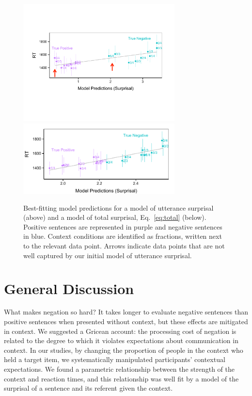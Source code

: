 \documentclass[10pt,letterpaper]{article}
\begin{document}
\begin{figure}[t]
\begin{center} 
\includegraphics[width=3.25in]{figures/model1_comparison.pdf}
\includegraphics[width=3.25in]{figures/model2_comparison.pdf}
\caption{\label{fig:model1_sims} Best-fitting model predictions for a model of utterance surprisal (above) and a model of total surprisal, Eq.\ \ref{eq:total} (below).  Positive sentences are represented in purple and negative sentences in blue.  Context conditions are identified as fractions, written next to the relevant data point.  Arrows indicate data points that are not well captured by our initial model of utterance surprisal.}
\end{center} 
\end{figure}





\section{General Discussion}

What makes negation so hard? It takes longer to evaluate negative sentences than positive sentences when presented without context, but these effects are mitigated in context. We suggested a Gricean account: the processing cost of negation is related to the degree to which it violates expectations about communication in context. In our studies, by changing the proportion of people in the context who held a target item, we systematically manipulated participants' contextual expectations.  We found a parametric relationship between the strength of the context and reaction times, and this relationship was well fit by a model of the surprisal of a sentence and its referent given the context.
\end{document}
